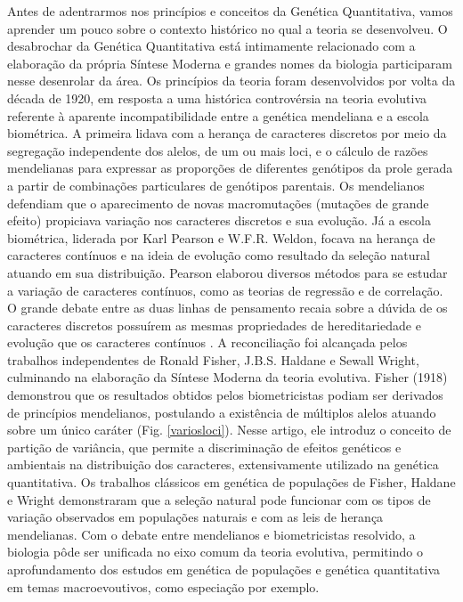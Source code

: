 \documentclass[portuges,]{tufte-handout}
\begin{document}
Antes de adentrarmos nos princípios e conceitos da Genética
Quantitativa, vamos aprender um pouco sobre o contexto histórico no qual
a teoria se desenvolveu. O desabrochar da Genética Quantitativa está
intimamente relacionado com a elaboração da própria Síntese Moderna e
grandes nomes da biologia participaram nesse desenrolar da área. Os
princípios da teoria foram desenvolvidos por volta da década de 1920, em
resposta a uma histórica controvérsia na teoria evolutiva referente à
aparente incompatibilidade entre a genética mendeliana e a escola
biométrica. A primeira lidava com a herança de caracteres discretos por
meio da segregação independente dos alelos, de um ou mais loci, e o
cálculo de razões mendelianas para expressar as proporções de diferentes
genótipos da prole gerada a partir de combinações particulares de
genótipos parentais. Os mendelianos defendiam que o aparecimento de
novas macromutações (mutações de grande efeito) propiciava variação nos
caracteres discretos e sua evolução. Já a escola biométrica, liderada
por Karl Pearson e W.F.R. Weldon, focava na herança de caracteres
contínuos e na ideia de evolução como resultado da seleção natural
atuando em sua distribuição. Pearson elaborou diversos métodos para se
estudar a variação de caracteres contínuos, como as teorias de regressão
e de correlação. O grande debate entre as duas linhas de pensamento
recaia sobre a dúvida de os caracteres discretos possuírem as mesmas
propriedades de hereditariedade e evolução que os caracteres contínuos
\cite{Lynch1998}. A reconciliação foi alcançada pelos trabalhos
independentes de Ronald Fisher, J.B.S. Haldane e Sewall Wright,
culminando na elaboração da Síntese Moderna da teoria evolutiva. Fisher
(1918) demonstrou que os resultados obtidos pelos biometricistas podiam
ser derivados de princípios mendelianos, postulando a existência de
múltiplos alelos atuando sobre um único caráter (Fig. \ref{variosloci}).
Nesse artigo, ele introduz o conceito de partição de variância, que
permite a discriminação de efeitos genéticos e ambientais na
distribuição dos caracteres, extensivamente utilizado na genética
quantitativa. Os trabalhos clássicos em genética de populações de
Fisher, Haldane e Wright demonstraram que a seleção natural pode
funcionar com os tipos de variação observados em populações naturais e
com as leis de herança mendelianas. Com o debate entre mendelianos e
biometricistas resolvido, a biologia pôde ser unificada no eixo comum da
teoria evolutiva, permitindo o aprofundamento dos estudos em genética de
populações e genética quantitativa em temas macroevoutivos, como
especiação por exemplo.
\end{document}
